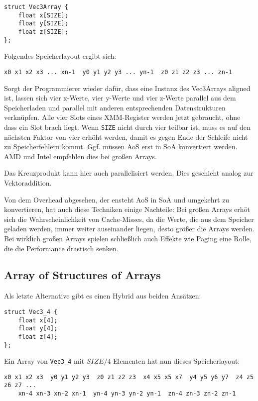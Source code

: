\documentclass[a4paper,10pt]{article}
\begin{document}
\begin{verbatim}
struct Vec3Array {
    float x[SIZE];
    float y[SIZE];
    float z[SIZE];
};
\end{verbatim}

Folgendes Speicherlayout ergibt sich:

\begin{verbatim}
x0 x1 x2 x3 ... xn-1  y0 y1 y2 y3 ... yn-1  z0 z1 z2 z3 ... zn-1
\end{verbatim}

Sorgt der Programmierer wieder dafür, dass eine Instanz des Vec3Arrays aligned ist, lassen sich vier
x-Werte, vier y-Werte und vier z-Werte parallel aus dem Speicherladen und parallel mit anderen
entsprechenden Datenstrukturen verknüpfen. Alle vier Slots eines XMM-Register werden jetzt
gebraucht, ohne dass ein Slot brach liegt. Wenn \texttt{SIZE} nicht durch vier teilbar ist, muss es
auf den nächsten Faktor von vier erhöht werden, damit es gegen Ende der Schleife nicht zu
Speicherfehlern kommt. Ggf. müssen AoS erst in SoA konvertiert werden. AMD und Intel empfehlen dies
bei großen Arrays. 

Das Kreuzprodukt kann hier auch parallelisiert werden. Dies geschieht analog zur Vektoraddition.

Von dem Overhead abgesehen, der ensteht AoS in SoA und umgekehrt zu konvertieren, hat auch diese
Techniken einige Nachteile: Bei großen Arrays erhöt sich die Wahrscheinlichkeit von Cache-Misses, da
die Werte, die aus dem Speicher geladen werden, immer weiter auseinander liegen, desto größer die
Arrays werden. Bei wirklich großen Arrays spielen schließlich auch Effekte wie Paging eine Rolle,
die die Performance drastisch senken.

\subsection{Array of Structures of Arrays}

Als letzte Alternative gibt es einen Hybrid aus beiden Ansätzen:

\begin{verbatim}
struct Vec3_4 {
    float x[4];
    float y[4];
    float z[4];
};
\end{verbatim}

Ein Array von \texttt{Vec3\_4} mit $SIZE/4$ Elementen hat nun dieses Speicherlayout:

\begin{verbatim}
x0 x1 x2 x3  y0 y1 y2 y3  z0 z1 z2 z3  x4 x5 x5 x7  y4 y5 y6 y7  z4 z5 z6 z7 ... 
    xn-4 xn-3 xn-2 xn-1  yn-4 yn-3 yn-2 yn-1  zn-4 zn-3 zn-2 zn-1
\end{verbatim}
\end{document}

